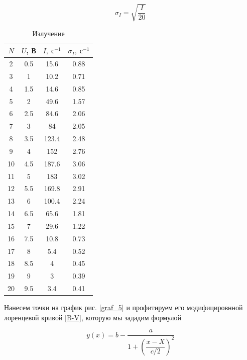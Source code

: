 \documentclass[12pt]{kiarticle} %
\begin{document}
	\begin{equation}\label{}
	\sigma_I = \sqrt{\dfrac{I}{20}}
	\end{equation}
	
	 \begin{table}[h]
	 	\caption{Излучение}
	 	\begin{center}
	 		\begin{tabular}{|c|c|c|c|}
	 			\hline
	 			$ N  $ & $ U $, В &  $ I, \; с^{-1} $ & $ \sigma_I, \; с^{-1} $  \\
	 			\hline
	 			2 & 0.5 & 15.6 & 0.88 \\
	 			3 & 1 & 10.2 & 0.71 \\
	 			4 & 1.5 & 14.6 & 0.85 \\
	 			5 & 2 & 49.6 & 1.57 \\
	 			6 & 2.5 & 84.6 & 2.06 \\
	 			7 & 3 & 84 & 2.05 \\
	 			8 & 3.5 & 123.4 & 2.48 \\
	 			9 & 4 & 152 & 2.76 \\
	 			10 & 4.5 & 187.6 & 3.06 \\
	 			11 & 5 & 183 & 3.02 \\
	 			12 & 5.5 & 169.8 & 2.91 \\
	 			13 & 6 & 100.4 & 2.24 \\
	 			14 & 6.5 & 65.6 & 1.81 \\
	 			15 & 7 & 29.6 & 1.22 \\
	 			16 & 7.5 & 10.8 & 0.73 \\
	 			17 & 8 & 5.4 & 0.52 \\
	 			18 & 8.5 & 4 & 0.45 \\
	 			19 & 9 & 3 & 0.39 \\
	 			20 & 9.5 & 3.4 & 0.41 \\
	 			\hline
	 		\end{tabular}
	 	\end{center}
	 	\label{table_5}
	 \end{table}
 
 Нанесем точки на график рис. \ref{graf_5} и профитируем его модифицировнной лоренцевой кривой \eqref{B-V}, которую мы зададим формулой
 	
 	\begin{equation}\label{yotx}
 y (x) = b - \dfrac{a}{1 + \left( \dfrac{x-X}{c/2}\right) ^2}
 \end{equation}
 
\end{document}
